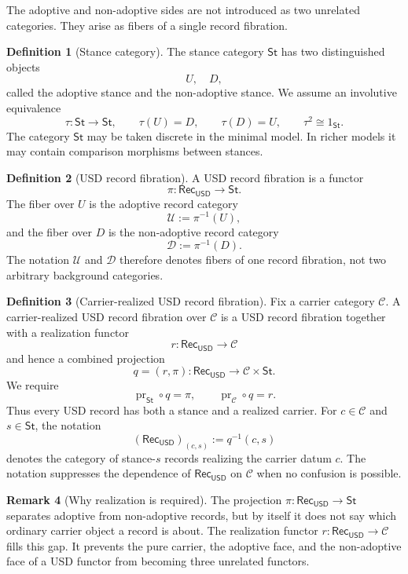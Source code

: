 \documentclass[11pt]{article}
\newcommand{\USD}{\mathsf{USD}}
\newcommand{\RecUSD}{\mathsf{Rec}_{\USD}}
\newcommand{\St}{\mathsf{St}}
\newcommand{\UFib}{\mathcal U}
\newcommand{\DFib}{\mathcal D}
\newcommand{\defeq}{\mathrel{:=}}
\theoremstyle{definition}
\newtheorem{definition}{Definition}[section]
\newtheorem{remark}[definition]{Remark}
\theoremstyle{plain}
\begin{document}
The adoptive and non-adoptive sides are not introduced as two unrelated
categories.  They arise as fibers of a single record fibration.

\begin{definition}[Stance category]
The stance category $\St$ has two distinguished objects
\[
  U,\quad D,
\]
called the adoptive stance and the non-adoptive stance.  We assume an
involutive equivalence
\[
  \tau:\St\to\St,
  \qquad \tau(U)=D,
  \qquad \tau(D)=U,
  \qquad \tau^2\cong 1_{\St}.
\]
The category $\St$ may be taken discrete in the minimal model.  In richer
models it may contain comparison morphisms between stances.
\end{definition}

\begin{definition}[USD record fibration]
A USD record fibration is a functor
\[
  \pi:\RecUSD\to \St.
\]
The fiber over $U$ is the adoptive record category
\[
  \UFib\defeq \pi^{-1}(U),
\]
and the fiber over $D$ is the non-adoptive record category
\[
  \DFib\defeq \pi^{-1}(D).
\]
The notation $\UFib$ and $\DFib$ therefore denotes fibers of one record
fibration, not two arbitrary background categories.
\end{definition}

\begin{definition}[Carrier-realized USD record fibration]
Fix a carrier category $\mathcal C$.  A carrier-realized USD record
fibration over $\mathcal C$ is a USD record fibration together with a
realization functor
\[
  r:\RecUSD\to\mathcal C
\]
and hence a combined projection
\[
  q=(r,\pi):\RecUSD\to\mathcal C\times\St.
\]
We require
\[
  \operatorname{pr}_{\St}\circ q=\pi,
  \qquad
  \operatorname{pr}_{\mathcal C}\circ q=r.
\]
Thus every USD record has both a stance and a realized carrier.  For
$c\in\mathcal C$ and $s\in\St$, the notation
\[
  (\RecUSD)_{(c,s)}\defeq q^{-1}(c,s)
\]
denotes the category of stance-$s$ records realizing the carrier datum
$c$.  The notation suppresses the dependence of $\RecUSD$ on
$\mathcal C$ when no confusion is possible.
\end{definition}

\begin{remark}[Why realization is required]
The projection $\pi:\RecUSD\to\St$ separates adoptive from non-adoptive
records, but by itself it does not say which ordinary carrier object a
record is about.  The realization functor $r:\RecUSD\to\mathcal C$ fills
this gap.  It prevents the pure carrier, the adoptive face, and the
non-adoptive face of a USD functor from becoming three unrelated
functors.
\end{remark}
\end{document}
